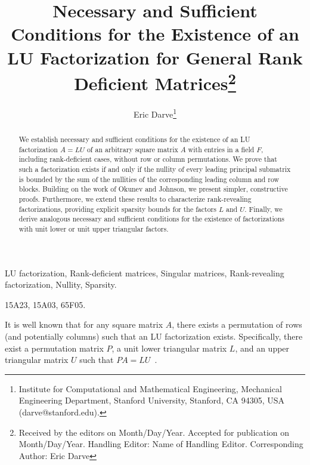 \documentclass[10pt,twoside]{siamart1116}
\newcommand{\HE}{Name of Handling Editor}
\newcommand{\DoS}{Month/Day/Year}
\newcommand{\DoA}{Month/Day/Year}
\newcommand{\CA}{Eric Darve}
\newcommand{\Names}{Eric Darve}
\newcommand{\Title}{Necessary and Sufficient Conditions for the Existence of an LU Factorization for General Rank Deficient Matrices}
\numberwithin{theorem}{section}
\begin{document}
% 

%
\setcounter{page}{1}

\thispagestyle{empty}

\title{\Title\thanks{Received
    by the editors on \DoS.
    Accepted for publication on \DoA.
Handling Editor: \HE. Corresponding Author: \CA}}

\author{
  Eric Darve\thanks{Institute for Computational and Mathematical Engineering,
    Mechanical Engineering Department,
    Stanford University,
    Stanford, CA 94305, USA
  (darve@stanford.edu).}
}


\maketitle

\begin{abstract}
  We establish necessary and sufficient conditions for the existence of an LU factorization $A=LU$ of an arbitrary square matrix $A$ with entries in a field $F$, including rank-deficient cases, without row or column permutations. We prove that such a factorization exists if and only if the nullity of every leading principal submatrix is bounded by the sum of the nullities of the corresponding leading column and row blocks. Building on the work of Okunev and Johnson, we present simpler, constructive proofs. Furthermore, we extend these results to characterize rank-revealing factorizations, providing explicit sparsity bounds for the factors $L$ and $U$. Finally, we derive analogous necessary and sufficient conditions for the existence of factorizations with unit lower or unit upper triangular factors.
\end{abstract}

\begin{keywords}
  LU factorization, Rank-deficient matrices, Singular matrices, Rank-revealing factorization, Nullity, Sparsity.
\end{keywords}
\begin{AMS}
  15A23, 15A03, 65F05.
\end{AMS}

It is well known that for any square matrix $A$, there exists a permutation of rows (and potentially columns) such that an LU factorization exists. Specifically, there exist a permutation matrix $P$, a unit lower triangular matrix $L$, and an upper triangular matrix $U$ such that $PA = LU$~\cite{higham_gaussian_2011,lu_numerical_2021}.
\end{document}
